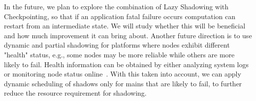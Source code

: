 In the future, we plan to explore the combination of Lazy Shadowing with Checkpointing, so that if an application fatal failure occurs computation can restart from an intermediate state. We will study whether this will be beneficial and how much improvement it can bring about. 
Another future direction is to use dynamic and partial shadowing for platforms where nodes exhibit different "health" status, e.g., some nodes may be more reliable while others are more likely to fail. 
Health information can be obtained by either analyzing system logs or monitoring node status online~\cite{6468487}. 
With this taken into account, we can apply dynamic scheduling of shadows only for mains that are likely to fail, to further reduce the resource requirement for shadowing.

